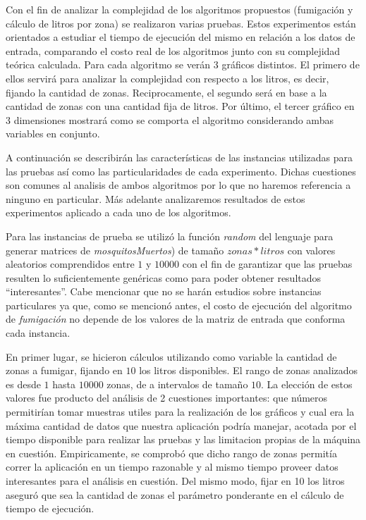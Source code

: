 \documentclass[a4paper,11pt] {article}
\begin{document}
Con el fin de analizar la complejidad de los algoritmos propuestos (fumigaci\'on y c\'alculo de litros por zona) se realizaron varias pruebas. Estos experimentos est\'an orientados a estudiar el tiempo de ejecuci\'on del mismo en relaci\'on a los datos de entrada, comparando el costo real de los algoritmos junto con su complejidad te\'orica calculada. Para cada algoritmo se ver\'an 3 gr\'aficos distintos. El primero de ellos servir\'a para analizar la complejidad con respecto a los litros, es decir, fijando la cantidad de zonas. Reciprocamente, el segundo ser\'a en base a la cantidad de zonas con una cantidad fija de litros. Por \'ultimo, el tercer gr\'afico en 3 dimensiones mostrar\'a como se comporta el algoritmo considerando ambas variables en conjunto.

A continuaci\'on se describir\'an las caracter\'isticas de las instancias utilizadas para las pruebas as\'i como las particularidades de cada experimento. Dichas cuestiones son comunes al analisis de ambos algoritmos por lo que no haremos referencia a ninguno en particular. M\'as adelante analizaremos resultados de estos experimentos aplicado a cada uno de los algoritmos.

Para las instancias de prueba se utiliz\'o la funci\'on \textit{random} del lenguaje para generar matrices de \textit{mosquitosMuertos}) de tamaño $zonas*litros$ con valores aleatorios comprendidos entre $1$ y $10000$ con el fin de garantizar que las pruebas resulten lo suficientemente gen\'ericas como para poder obtener resultados ``interesantes''. Cabe mencionar que no se har\'an estudios sobre instancias particulares ya que, como se mencion\'o antes, el costo de ejecuci\'on del algoritmo de \textit{fumigaci\'on} no depende de los valores de la matriz de entrada que conforma cada instancia.

En primer lugar, se hicieron c\'alculos utilizando como variable la cantidad de zonas a fumigar, fijando en $10$ los litros disponibles. El rango de zonas analizados es desde $1$ hasta $10000$ zonas, de a intervalos de tamaño $10$. La elecci\'on de estos valores fue producto del an\'alisis de 2 cuestiones importantes: que n\'umeros permitir\'ian tomar muestras utiles para la realizaci\'on de los gr\'aficos y cual era la m\'axima cantidad de datos que nuestra aplicaci\'on podr\'ia manejar, acotada por el tiempo disponible para realizar las pruebas y las limitacion propias de la m\'aquina en cuesti\'on. Empiricamente, se comprob\'o que dicho rango de zonas permit\'ia correr la aplicaci\'on en un tiempo razonable y al mismo tiempo proveer datos interesantes para el an\'alisis en cuesti\'on. Del mismo modo, fijar en 10 los litros asegur\'o que sea la cantidad de zonas el par\'ametro ponderante en el c\'alculo de tiempo de ejecuci\'on.
\end{document}
